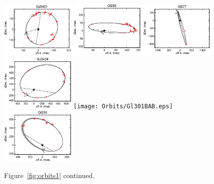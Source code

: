 \documentclass[twocolumn]{aastex62}
\begin{document}
\begin{figure}[htp]
\begin{center}
\includegraphics[width=0.32\textwidth]{Orbits/GJ3421AB.eps}
\includegraphics[width=0.32\textwidth]{Orbits/Gl263AB.eps}
\includegraphics[width=0.32\textwidth]{Orbits/Gl277AB.eps}
\includegraphics[width=0.32\textwidth]{Orbits/GJ3454AB.eps}
\texttt{[image: Orbits/Gl301BAB.eps]}
\includegraphics[width=0.32\textwidth]{Orbits/Gl310AB.eps}
\caption{Figure~\ref{fig:orbits1} continued.}
\label{fig:orbits2}
\end{center}
\end{figure}
\end{document}
